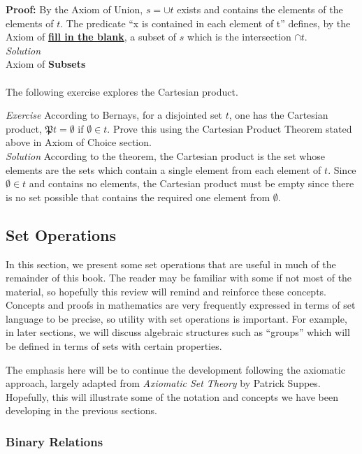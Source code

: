 \textbf{Proof:}  By the Axiom of Union, $s=\cup t$ exists and contains the elements of the elements of $t$.  The predicate ``x is contained in each element of t'' defines, by the Axiom of \textbf{\underline{fill in the blank}}, a subset of $s$ which is the intersection $\cap t$.\\


\textit{Solution}\\
Axiom of \textbf{Subsets}\\\\

The following exercise explores the Cartesian product.

\textit{Exercise}  According to Bernays, for a disjointed set $t$, one has the Cartesian product, $\mathfrak{P}t=\emptyset$ if $\emptyset \in t.$  Prove this using the Cartesian Product Theorem stated above in Axiom of Choice section.\\

\textit{Solution}
According to the theorem, the Cartesian product is the set whose elements are the sets which contain a single element from each element of $t$.  Since $\emptyset \in t$ and contains no elements, the Cartesian product must be empty since there is no set possible that contains the required one element from $\emptyset$.\\

\subsection{Set Operations}
In this section, we present some set operations that are useful in much of the remainder of this book.  The reader may be familiar with some if not most of the material, so hopefully this review will remind and reinforce these concepts.  Concepts and proofs in mathematics are very frequently expressed in terms of set language to be precise, so utility with set operations is important.  For example, in later sections, we will discuss algebraic structures such as ``groups'' which will be defined in terms of sets with certain properties.  

The emphasis here will be to continue the development following the axiomatic approach, largely adapted from \textit{Axiomatic Set Theory} by Patrick Suppes.  Hopefully, this will illustrate some of the notation and concepts we have been developing in the previous sections.\\

\subsubsection{Binary Relations}

